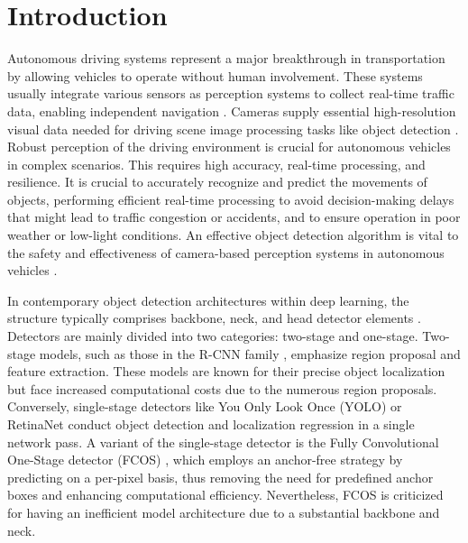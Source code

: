 \section{Introduction}
\label{sec:intro}
Autonomous driving systems represent a major breakthrough in transportation by allowing vehicles to operate without human involvement. These systems usually integrate various sensors as perception systems to collect real-time traffic data, enabling independent navigation \cite{betz2022autonomous}. Cameras supply essential high-resolution visual data needed for driving scene image processing tasks like object detection \cite{wang2024occludedinst}. Robust perception of the driving environment is crucial for autonomous vehicles in complex scenarios. This requires high accuracy, real-time processing, and resilience. It is crucial to accurately recognize and predict the movements of objects, performing efficient real-time processing to avoid decision-making delays that might lead to traffic congestion or accidents, and to ensure operation in poor weather or low-light conditions. An effective object detection algorithm is vital to the safety and effectiveness of camera-based perception systems in autonomous vehicles \cite{chib2023recent}.

In contemporary object detection architectures within deep learning, the structure typically comprises backbone, neck, and head detector elements \cite{chen2022mixed, wang2025yolov9, farhadi2018yolov3}. Detectors are mainly divided into two categories: two-stage and one-stage. Two-stage models, such as those in the R-CNN family \cite{ yang9847011, li10474576}, emphasize region proposal and feature extraction. These models are known for their precise object localization but face increased computational costs due to the numerous region proposals. Conversely, single-stage detectors like You Only Look Once (YOLO) \cite{Tian9298480} or RetinaNet \cite{ross2017focal} conduct object detection and localization regression in a single network pass. A variant of the single-stage detector is the Fully Convolutional One-Stage detector (FCOS) \cite{9010746,tian2020fcos}, which employs an anchor-free strategy by predicting on a per-pixel basis, thus removing the need for predefined anchor boxes and enhancing computational efficiency. Nevertheless, FCOS is criticized for having an inefficient model architecture due to a substantial backbone and neck. 

